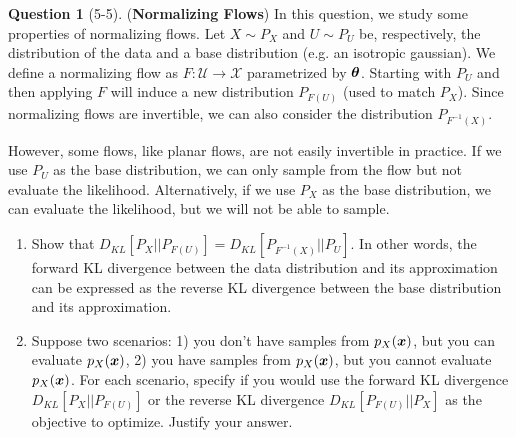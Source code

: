 \documentclass[12pt]{article}
\newif\ifsolution
\theoremstyle{definition}
\newtheorem{exercise}{Question}%
\newtheorem{answer}{Answer} %
\newcommand{\Answer}[1]{
\ifsolution
\begin{answer}#1\end{answer}
\fi
}
\begin{document}
\begin{exercise}[5-5] (\textbf{Normalizing Flows})
In this question, we study some properties of normalizing flows. Let $X \sim P_X$ and $U \sim P_U$ be, respectively, the distribution of the data and a base distribution (e.g. an isotropic gaussian). We define a normalizing flow as $F: \mathcal{U} \rightarrow \mathcal{X}$ parametrized by ${\bm{\theta}}$. Starting with $P_U$ and then applying $F$ will induce a new distribution $P_{F(U)}$ (used to match $P_X$). Since normalizing flows are invertible, we can also consider the distribution $P_{F^{-1}(X)}$.

However, some flows, like planar flows, are not easily invertible in practice. If we use $P_U$ as the base distribution, we can only sample from the flow but not evaluate the likelihood. Alternatively, if we use $P_X$ as the base distribution, we can evaluate the likelihood, but we will not be able to sample.

\begin{enumerate}[label=\arabic{exercise}.\arabic*]
    \item Show that $D_{KL}[P_X || P_{F(U)}] = D_{KL}[P_{F^{-1}(X)} || P_U]$. In other words, the forward KL divergence between the data distribution and its approximation can be expressed as the reverse KL divergence between the base distribution and its approximation. 
    \item Suppose two scenarios: 1) you don't have samples from $p_X({\bm{x}})$, but you can evaluate $p_X({\bm{x}})$, 2) you have samples from $p_X({\bm{x}})$, but you cannot evaluate $p_X({\bm{x}})$. For each scenario, specify if you would use the forward KL divergence $D_{KL}[P_X || P_{F(U)}]$ or the reverse KL divergence $D_{KL}[P_{F(U)} || P_X]$ as the objective to optimize. Justify your answer.
\end{enumerate}


\Answer{
}
\end{exercise}
\end{document}
